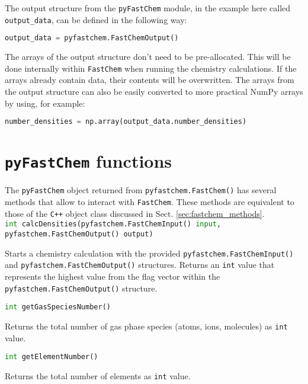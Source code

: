 \documentclass[numbers=noenddot]{aux/fcmanual}
\newcommand{\fc}{\texttt{FastChem}\xspace}
\newcommand{\pfc}{\texttt{pyFastChem}\xspace}
\newcommand{\cpp}{\ttt{C++}\xspace}
\newcommand{\ttt}[1]{\texttt {#1}}
\begin{document}
\bigbreak

The output structure from the \pfc module, in the example here called \lstinline!output_data!, can be defined in the following way:
\begin{lstlisting}[language=Python]
	output_data = pyfastchem.FastChemOutput()
\end{lstlisting}

The arrays of the output structure don't need to be pre-allocated. This will be done internally within \fc when running the chemistry calculations. If the arrays already contain data, their contents will be overwritten. The arrays from the output structure can also be easily converted to more practical NumPy arrays by using, for example:
\begin{lstlisting}[language=Python]
  number_densities = np.array(output_data.number_densities)
\end{lstlisting} 


\section{\pfc functions}
\label{sec:pfc_methods}

The \pfc object returned from \lstinline[language=Python]!pyfastchem.FastChem()! has several methods that allow to interact with \fc. These methods are equivalent to those of the \cpp object class discussed in Sect. \ref{sec:fastchem_methods}.\\

\lstinline[language=Python]!int calcDensities(pyfastchem.FastChemInput() input, pyfastchem.FastChemOutput() output)!
\begin{addmargin}[25pt]{0pt}
	Starts a chemistry calculation with the provided \lstinline!pyfastchem.FastChemInput()! and \lstinline!pyfastchem.FastChemOutput()! structures. Returns an \lstinline!int! value that represents the highest value from the flag vector within the \lstinline!pyfastchem.FastChemOutput()! structure.
\end{addmargin}

\bigbreak

\lstinline[language=Python]!int getGasSpeciesNumber()!
\begin{addmargin}[25pt]{0pt}
	Returns the total number of gas phase species (atoms, ions, molecules) as \lstinline!int! value.
\end{addmargin}

\bigbreak

\lstinline[language=Python]!int getElementNumber()!
\begin{addmargin}[25pt]{0pt}
	Returns the total number of elements as \lstinline!int! value.
\end{addmargin}
\end{document}
